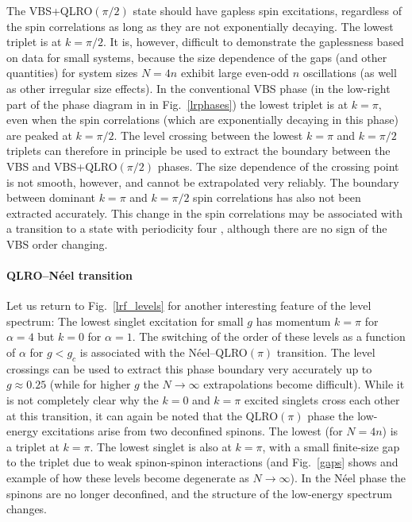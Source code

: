 \documentclass[draft,numberedheadings]{aipproc}
\begin{document}
The VBS+QLRO$(\pi/2)$ state should have gapless spin excitations, regardless of the spin correlations as long as they are not exponentially decaying. 
The lowest triplet is at $k=\pi/2$. It is, however, difficult to demonstrate the gaplessness based on data for small systems, because the size dependence 
of the gaps (and other quantities) for system sizes $N=4n$ exhibit large even-odd $n$ oscillations (as well as other irregular size effects). In 
the conventional VBS phase (in the low-right part of the phase diagram in in Fig.~\ref{lrphases}) the lowest triplet 
is at $k=\pi$, even when the spin correlations (which are exponentially decaying in this phase) are peaked at $k=\pi/2$. The level crossing between the 
lowest $k=\pi$ and $k=\pi/2$ triplets can therefore in principle be used to extract the boundary between the VBS and VBS+QLRO$(\pi/2)$ phases. 
The size dependence of the crossing point is not smooth, however, and cannot be extrapolated very reliably. The boundary between dominant $k=\pi$ 
and $k=\pi/2$ spin correlations has also not been extracted accurately. This change in the spin correlations may be associated with a transition to 
a state with periodicity four \cite{bursill96}, although there are no sign of the VBS order changing.

\paragraph{QLRO--N\'eel transition}

Let us return to Fig.~\ref{lrf_levels} for another interesting feature of the level spectrum: The lowest singlet excitation for small $g$ has 
momentum $k=\pi$ for $\alpha=4$ but $k=0$ for $\alpha=1$. The switching of the order of these levels as a function of $\alpha$ for $g<g_c$ is associated 
with the N\'eel--QLRO$(\pi)$ transition. The level crossings can be used to extract this phase boundary very accurately up to $g \approx 0.25$ (while for 
higher $g$ the $N\to \infty$ extrapolations become difficult). While it is not completely clear why the $k=0$ and $k=\pi$ excited singlets cross each
other at this transition, it can again be noted that the QLRO$(\pi)$ phase the low-energy excitations arise from two deconfined spinons. The lowest 
(for $N=4n$) is a triplet at $k=\pi$. The lowest singlet is also at $k=\pi$, with a small finite-size gap to the triplet due to weak spinon-spinon 
interactions (and Fig.~\ref{gaps} shows and example of how these levels become degenerate as $N\to \infty$). In the N\'eel phase the spinons are no 
longer deconfined, and the structure of the low-energy spectrum changes. 
\end{document}
